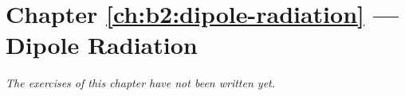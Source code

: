 \section*{Chapter \ref{ch:b2:dipole-radiation} --- Dipole Radiation}


\emph{The exercises of this chapter have not been written yet.}

